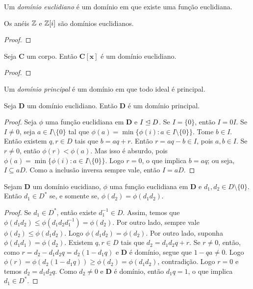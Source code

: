 \begin{defi}
	Um \emph{domínio euclidiano} é um domínio em que existe uma função euclidiana.
\end{defi}

\begin{prop}
	Os anéis $\mathbb{Z}$ e $\mathbb{Z}[i]$ são domínios euclidianos.
\end{prop}
\begin{proof}

\end{proof}

\begin{prop}
	Seja $\bm C$ um corpo. Então $\bm{C[x]}$ é um domínio euclidiano.
\end{prop}
\begin{proof}

\end{proof}

\begin{defi}
	Um \emph{domínio principal} é um domínio em que todo ideal é principal.
\end{defi}

\begin{prop}
 Seja $\bm D$ um domínio euclidiano. Então $\bm D$ é um domínio principal.
\end{prop}
\begin{proof}
	Seja $\phi$ uma função euclidiana em $\bm D$ e $I \mathrel{\unlhd} D$. Se $I = \{0\}$, então $I = 0I$. Se $I \neq 0$, seja $a \in I \setminus \{0\}$ tal que $\phi(a) = \min\{\phi(i) : a \in I \setminus \{0\}\}$. Tome $b \in I$. Então existem $q,r \in D$ tais que $b=aq+r$. Então $r = aq-b \in I$, pois $a,b \in I$. Se $r \neq 0$, então $\phi(r) < \phi(a)$. Mas isso é absurdo, pois $\phi(a) = \min\{\phi(i) : a \in I \setminus \{0\}\}$. Logo $r=0$, o que implica $b=aq$; ou seja, $I \subseteq aD$. Como a inclusão inversa sempre vale, então $I=aD$.
\end{proof}

\begin{prop}
	Sejam $\bm D$ um domínio eucidiano, $\phi$ uma função euclidiana em $\bm D$ e $d_1,d_2 \in D \setminus \{0\}$. Então $d_1 \in D^*$ se, e somente se, $\phi(d_2) = \phi(d_1d_2)$.
\end{prop}
\begin{proof}
	Se $d_1 \in D^*$, então existe $d_1^{-1} \in D$. Assim, temos que $\phi(d_1d_2) \leq \phi(d_1d_2d_1^{-1})=\phi(d_2)$. Por outro lado, sempre vale $\phi(d_2) \leq \phi(d_1d_2)$. Logo $\phi(d_1d_2)=\phi(d_2)$. Por outro lado, suponha $\phi(d_1d_1)=\phi(d_2)$. Existem $q,r \in D$ tais que $d_2 = d_1d_2q+r$. Se $r \neq 0$, então, como $r = d_2-d_1d_2q = d_2(1-d_1q)$ e $\bm D$ é domínio, segue que $1-qa \neq 0$. Logo $\phi(r)=\phi(d_2(1-d_1q)) \geq \phi(d_2) = \phi(d_1d_2)$, contradição. Logo $r=0$ e temos $d_2=d_1d_2q$. Como $d_2 \neq 0$ e $\bm D$ é domínio, então $d_1q = 1$, o que implica $d_1 \in D^*$.
\end{proof}

